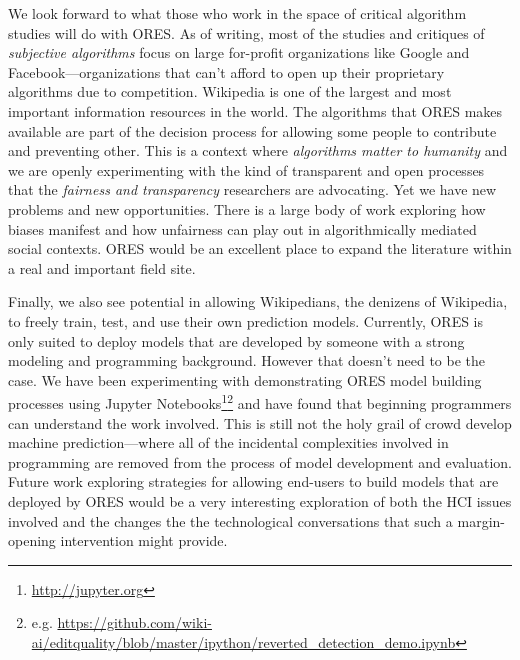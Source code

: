 We look forward to what those who work in the space of critical algorithm studies will do with ORES.  As of writing, most of the studies and critiques of \emph{subjective algorithms}\cite{tufekci2015algorithms} focus on large for-profit organizations like Google and Facebook---organizations that can't afford to open up their proprietary algorithms due to competition.  Wikipedia is one of the largest and most important information resources in the world.  The algorithms that ORES makes available are part of the decision process for allowing some people to contribute and preventing other.  This is a context where \emph{algorithms matter to humanity} and we are openly experimenting with the kind of transparent and open processes that the \emph{fairness and transparency} researchers are advocating.  Yet we have new problems and new opportunities.  There is a large body of work exploring how biases manifest and how unfairness can play out in algorithmically mediated social contexts.  ORES would be an excellent place to expand the literature within a real and important field site.

Finally, we also see potential in allowing Wikipedians, the denizens of Wikipedia, to freely train, test, and use their own prediction models.  Currently, ORES is only suited to deploy models that are developed by someone with a strong modeling and programming background.  However that doesn't need to be the case.  We have been experimenting with demonstrating ORES model building processes using Jupyter Notebooks\footnote{\url{http://jupyter.org}}\footnote{e.g. \url{ https://github.com/wiki-ai/editquality/blob/master/ipython/reverted_detection_demo.ipynb}} and have found that beginning programmers can understand the work involved.  This is still not the holy grail of crowd develop machine prediction---where all of the incidental complexities involved in programming are removed from the process of model development and evaluation.  Future work exploring strategies for allowing end-users to build models that are deployed by ORES would be a very interesting exploration of both the HCI issues involved and the changes the the technological conversations that such a margin-opening intervention might provide.
